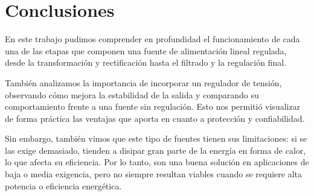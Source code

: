 \documentclass[chaptersright]{informeutn}
\begin{document}
  \chapter{Conclusiones}
    En este trabajo pudimos comprender en profundidad el funcionamiento de cada una de las etapas que componen una fuente
    de alimentación lineal regulada, desde la transformación y rectificación hasta el filtrado y la regulación final.

    También analizamos la importancia de incorporar un regulador de tensión, observando cómo mejora la estabilidad de la
    salida y comparando su comportamiento frente a una fuente sin regulación. Esto nos permitió visualizar de forma
    práctica las ventajas que aporta en cuanto a protección y confiabilidad.

    Sin embargo, también vimos que este tipo de fuentes tienen sus limitaciones: si se las exige demasiado, tienden a
    disipar gran parte de la energía en forma de calor, lo que afecta su eficiencia. Por lo tanto, son una buena solución
    en aplicaciones de baja o media exigencia, pero no siempre resultan viables cuando se requiere alta potencia o eficiencia energética.
\end{document}
